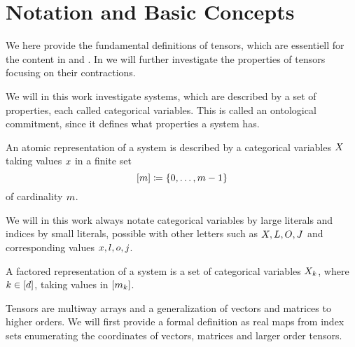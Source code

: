 \chapter{Notation and Basic Concepts}\label{cha:TensorNetworks}\label{cha:notation}

We here provide the fundamental definitions of tensors, which are essentiell for the content in  and .
In  we will further investigate the properties of tensors focusing on their contractions.

\sect{\bncategoricals}

We will in this work investigate systems, which are described by a set of properties, each called categorical variables.
This is called an ontological commitment, since it defines what properties a system has.

\begin{definition}
	An atomic representation of a system is described by a categorical variables $X$ taking values $x$ in a finite set
		\[  [m]\coloneqq \{0,\ldots, m-1\} \]
	of cardinality $m$.
\end{definition}

We will in this work always notate categorical variables by large literals and indices by small literals, possible with other letters such as $X,L,O,J$ and corresponding values $x,l,o,j$.

\begin{definition}
	A factored representation of a system is a set of categorical variables $X_{k}$, where $k\in[d]$, taking values in $[m_{k}]$.
\end{definition}

\sect{\bntensors}

Tensors are multiway arrays and a generalization of vectors and matrices to higher orders.
We will first provide a formal definition as real maps from index sets enumerating the coordinates of vectors, matrices and larger order tensors.

